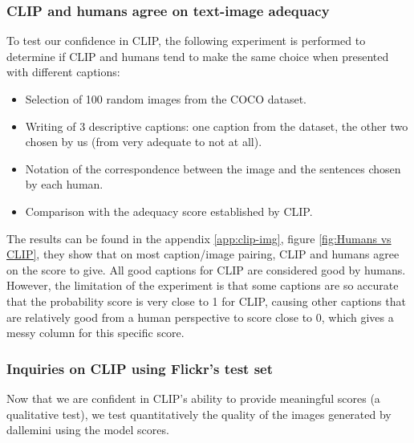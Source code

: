 \documentclass{article}
\begin{document}
\begin{multicols}{2}
\subsubsection{CLIP and humans agree on text-image adequacy}



To test our confidence in CLIP, the following experiment is performed to determine if CLIP and humans tend to make the same choice when presented with different captions: 
\begin{itemize}
  \item Selection of 100 random images from the COCO dataset.
  \item Writing of 3 descriptive captions: one caption from the dataset, the other two chosen by us (from very adequate to not at all).
  \item Notation of the correspondence between the image and the sentences chosen by each human.
  \item Comparison with the adequacy score established by CLIP.
\end{itemize}

The results can be found in the appendix \ref{app:clip-img}, figure \ref{fig:Humans vs CLIP}, they show that on most caption/image pairing, CLIP and humans agree on the score to give. All good captions for CLIP are considered good by humans. However, the limitation of the experiment is that some captions are so accurate that the probability score is very close to 1 for CLIP, causing other captions that are relatively good from a human perspective to score close to 0, which gives a messy column for this specific score.

\subsubsection{Inquiries on CLIP using Flickr's test set}

Now that we are confident in CLIP's ability to provide meaningful scores (a qualitative test), we test quantitatively the quality of the images generated by \gls{dallemini} using the model scores. 


\end{multicols}
\end{document}
